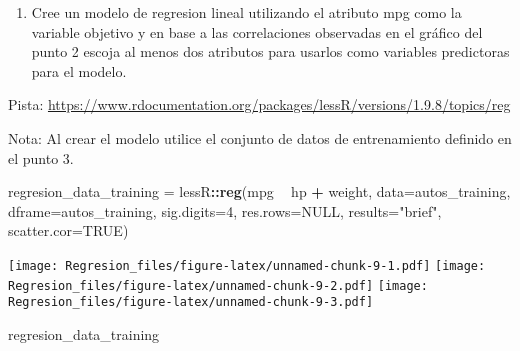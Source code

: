 \documentclass[]{article}
\newenvironment{Shaded}{\begin{snugshade}}{\end{snugshade}}
\newcommand{\DataTypeTok}[1]{\textcolor[rgb]{0.13,0.29,0.53}{#1}}
\newcommand{\DecValTok}[1]{\textcolor[rgb]{0.00,0.00,0.81}{#1}}
\newcommand{\KeywordTok}[1]{\textcolor[rgb]{0.13,0.29,0.53}{\textbf{#1}}}
\newcommand{\NormalTok}[1]{#1}
\newcommand{\OperatorTok}[1]{\textcolor[rgb]{0.81,0.36,0.00}{\textbf{#1}}}
\newcommand{\OtherTok}[1]{\textcolor[rgb]{0.56,0.35,0.01}{#1}}
\newcommand{\StringTok}[1]{\textcolor[rgb]{0.31,0.60,0.02}{#1}}
\providecommand{\tightlist}{%
  \setlength{\itemsep}{0pt}\setlength{\parskip}{0pt}}
\begin{document}
\begin{enumerate}
\def\labelenumi{\arabic{enumi}.}
\setcounter{enumi}{3}
\tightlist
\item
  Cree un modelo de regresion lineal utilizando el atributo mpg como la
  variable objetivo y en base a las correlaciones observadas en el
  gráfico del punto 2 escoja al menos dos atributos para usarlos como
  variables predictoras para el modelo.
\end{enumerate}

Pista:
\url{https://www.rdocumentation.org/packages/lessR/versions/1.9.8/topics/reg}

Nota: Al crear el modelo utilice el conjunto de datos de entrenamiento
definido en el punto 3.

\begin{Shaded}
\begin{Highlighting}[]
\NormalTok{regresion_data_training =}\StringTok{ }\NormalTok{lessR}\OperatorTok{::}\KeywordTok{reg}\NormalTok{(mpg }\OperatorTok{~}\StringTok{ }\NormalTok{hp }\OperatorTok{+}\StringTok{ }\NormalTok{weight, }
           \DataTypeTok{data=}\NormalTok{autos_training, }\DataTypeTok{dframe=}\NormalTok{autos_training, }
           \DataTypeTok{sig.digits=}\DecValTok{4}\NormalTok{, }\DataTypeTok{res.rows=}\OtherTok{NULL}\NormalTok{, }\DataTypeTok{results=}\StringTok{"brief"}\NormalTok{, }\DataTypeTok{scatter.cor=}\OtherTok{TRUE}\NormalTok{)}
\end{Highlighting}
\end{Shaded}

\texttt{[image: Regresion\_files/figure-latex/unnamed-chunk-9-1.pdf]}
\texttt{[image: Regresion\_files/figure-latex/unnamed-chunk-9-2.pdf]}
\texttt{[image: Regresion\_files/figure-latex/unnamed-chunk-9-3.pdf]}

\begin{Shaded}
\begin{Highlighting}[]
\NormalTok{regresion_data_training}
\end{Highlighting}
\end{Shaded}
\end{document}
